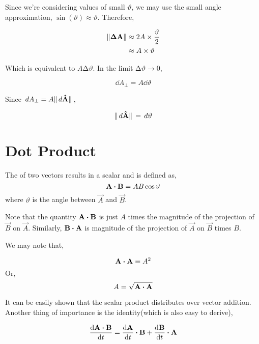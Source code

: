 Since we're considering values of small \(\vartheta\), we may use the small angle approximation,
\(\sin(\vartheta) \approx \vartheta\). Therefore,

\begin{marginfigure}
    \centering
    \caption{\(\increment\vec{A} \perp \vec{A}\)}
    \label{fig: timedev}
\end{marginfigure}

\begin{align}
    \norm{\boldsymbol{\mathbf{\Delta A}}} &\approx 2A \times \frac{\vartheta}{2}\\ 
    &\approx A \times \vartheta
\end{align}

Which is equivalent to \(A \increment \vartheta\). In the limit \(\increment \vartheta \to 0\),

\begin{equation}
    \dd{A_{\perp}} = A \dd{\vartheta}
\end{equation}

Since \(\mathop{}{d}{A}_{\perp} = A\norm*{\mathop{}{d}{\boldsymbol{\mathbf{\hat{A}}}}}\),

\begin{equation}
    \norm*{\mathop{}{d}{\boldsymbol{\mathbf{\hat{A}}}}} = \mathop{}{d}{\vartheta}
\end{equation}

\section{Dot Product}

The  of two vectors results in a scalar and is defined as,
\[\vec{A} \dotproduct \vec{B} = AB \cos\vartheta\]
where \(\vartheta\) is the angle between \(\vec{A}\) and \(\vec{B}\). 

Note that the quantity \(\vec{A} \dtp \vec{B}\) is just \(A\) times 
the magnitude of the projection of \(\vec{B}\) on \(\vec{A}\). Similarly, \(\vec{B} \dtp \vec{A}\) is
magnitude of the projection of \(\vec{A}\) on \(\vec{B}\) times \(B\).

We may note that,

\[\vec{A} \dtp \vec{A} = A^2\] Or,
\[A = \sqrt{\vec{A} \dtp \vec{A}}\]

It can be easily shown that the scalar product distributes over vector addition. 
Another thing of importance is the identity(which is also easy to derive),

\[\dv{\vec{A} \dtp \vec{B}}{t} = \dv{\vec{A}}{t} \dtp \vec{B} + \dv{\vec{B}}{t} \dtp \vec{A}\]

